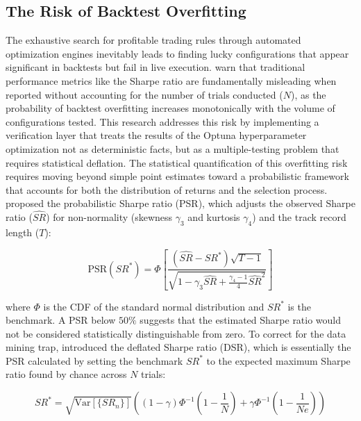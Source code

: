 \documentclass[12pt, a4paper]{article}
\begin{document}
\subsection{The Risk of Backtest Overfitting}\label{sec:backtest_overfitting}

The exhaustive search for profitable trading rules through automated optimization engines inevitably leads to finding 
lucky configurations that appear significant in backtests but fail in live execution. 
\textcite{bailey_deflated_2014} warn that traditional performance metrics like the Sharpe ratio 
are fundamentally misleading when reported without accounting for the number of trials conducted (\(N\)), 
as the probability of backtest overfitting increases monotonically with the volume of configurations tested. 
This research addresses this risk by implementing a verification layer that treats the results of the Optuna hyperparameter optimization 
not as deterministic facts, but as a multiple-testing problem that requires statistical deflation.
The statistical quantification of this overfitting risk requires moving beyond simple point estimates toward a probabilistic framework 
that accounts for both the distribution of returns and the selection process. 
\textcite{bailey_sharpe_2012} proposed the probabilistic Sharpe ratio (PSR), which adjusts the observed Sharpe ratio (\(\widehat{SR}\)) 
for non-normality (skewness \(\gamma_3\) and kurtosis \(\gamma_4\)) and the track record length (\(T\)):

\begin{equation}
\text{PSR}(SR^*) = \Phi \left[ \frac{(\widehat{SR} - SR^*) \sqrt{T-1}}{\sqrt{1 - \gamma_3 \widehat{SR} + \frac{\gamma_4 - 1}{4} \widehat{SR}^2}} \right]
\label{eq:psr}
\end{equation}

where \(\Phi\) is the CDF of the standard normal distribution and \(SR^*\) is the benchmark. A PSR below $50\%$ suggests that the estimated Sharpe ratio would 
not be considered statistically distinguishable from zero. To correct for the data mining trap, \textcite{bailey_deflated_2014} introduced the deflated Sharpe ratio (DSR), 
which is essentially the PSR calculated by setting the benchmark \(SR^*\) to the expected maximum Sharpe ratio found by chance 
across \(N\) trials:

\begin{equation}
SR^* = \sqrt{\text{Var}[\{SR_n\}]} \left( (1-\gamma) \Phi^{-1}\left(1 - \frac{1}{N}\right) + \gamma \Phi^{-1}\left(1 - \frac{1}{Ne}\right) \right)
\label{eq:sr_star}
\end{equation}
\end{document}
